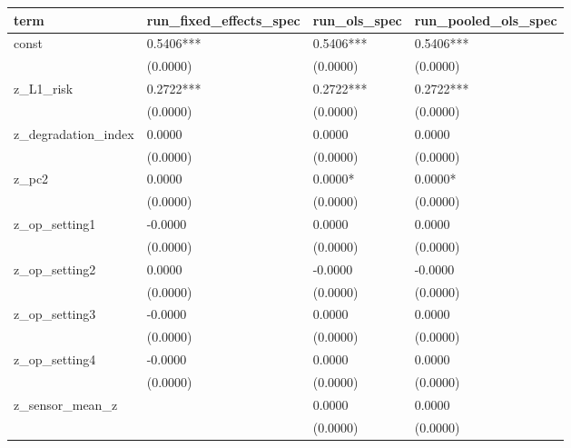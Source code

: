 \begin{tabular}{llll}
\toprule
term & run\_fixed\_effects\_spec & run\_ols\_spec & run\_pooled\_ols\_spec \\
\midrule
const & 0.5406*** & 0.5406*** & 0.5406*** \\
 & (0.0000) & (0.0000) & (0.0000) \\
z\_L1\_risk & 0.2722*** & 0.2722*** & 0.2722*** \\
 & (0.0000) & (0.0000) & (0.0000) \\
z\_degradation\_index & 0.0000 & 0.0000 & 0.0000 \\
 & (0.0000) & (0.0000) & (0.0000) \\
z\_pc2 & 0.0000 & 0.0000* & 0.0000* \\
 & (0.0000) & (0.0000) & (0.0000) \\
z\_op\_setting1 & -0.0000 & 0.0000 & 0.0000 \\
 & (0.0000) & (0.0000) & (0.0000) \\
z\_op\_setting2 & 0.0000 & -0.0000 & -0.0000 \\
 & (0.0000) & (0.0000) & (0.0000) \\
z\_op\_setting3 & -0.0000 & 0.0000 & 0.0000 \\
 & (0.0000) & (0.0000) & (0.0000) \\
z\_op\_setting4 & -0.0000 & 0.0000 & 0.0000 \\
 & (0.0000) & (0.0000) & (0.0000) \\
z\_sensor\_mean\_z &  & 0.0000 & 0.0000 \\
 &  & (0.0000) & (0.0000) \\
\bottomrule
\end{tabular}
